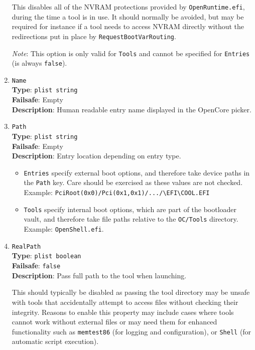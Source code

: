 \documentclass[]{article}
\providecommand{\tightlist}{%
  \setlength{\itemsep}{0pt}\setlength{\parskip}{0pt}}
\begin{document}
\begin{enumerate}
  This disables all of the NVRAM protections provided by
  \texttt{OpenRuntime.efi}, during the time a tool is in use. It should
  normally be avoided, but may be required for instance if a tool needs
  to access NVRAM directly without the redirections put in place by
  \texttt{RequestBootVarRouting}.

  \emph{Note}: This option is only valid for \texttt{Tools} and cannot be
  specified for \texttt{Entries} (is always \texttt{false}).

\item
  \texttt{Name}\\
  \textbf{Type}: \texttt{plist\ string}\\
  \textbf{Failsafe}: Empty\\
  \textbf{Description}: Human readable entry name displayed in the OpenCore picker.

\item
  \texttt{Path}\\
  \textbf{Type}: \texttt{plist\ string}\\
  \textbf{Failsafe}: Empty\\
  \textbf{Description}: Entry location depending on entry type.

  \begin{itemize}
  \tightlist
  \item \texttt{Entries} specify external boot options, and therefore take device
  paths in the \texttt{Path} key. Care should be exercised as these values are not checked.
  Example: \texttt{PciRoot(0x0)/Pci(0x1,0x1)/.../\textbackslash EFI\textbackslash COOL.EFI}
  \item \texttt{Tools} specify internal boot options, which are part of the bootloader
  vault, and therefore take file paths relative to the \texttt{OC/Tools} directory.
  Example: \texttt{OpenShell.efi}.
  \end{itemize}

\item
  \texttt{RealPath}\\
  \textbf{Type}: \texttt{plist\ boolean}\\
  \textbf{Failsafe}: \texttt{false}\\
  \textbf{Description}: Pass full path to the tool when launching.

  This should typically be disabled as passing the tool directory may be unsafe with
  tools that accidentally attempt to access files without checking their integrity.
  Reasons to enable this property may include cases where tools cannot work
  without external files or may need them for enhanced functionality such as
  \texttt{memtest86} (for logging and configuration), or \texttt{Shell} (for
  automatic script execution).


\end{enumerate}
\end{document}
